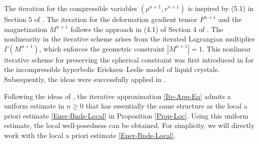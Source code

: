 \documentclass[reqno,11pt]{amsart}
\numberwithin{equation}{section}
\begin{document}
The iteration for the compressible variables $(\rho^{n+1}, v^{n+1})$ is inspired by (5.1) in Section 5 of \cite{JLT-M3AS-2020}. The iteration for the deformation gradient tensor $F^{n+1}$ and the magnetization $M^{n+1}$ follows the approach in (4.1) of Section 4 of \cite{JLL-JDE-2023}. The nonlinearity in the iterative scheme arises from the iterated Lagrangian multiplier $\Gamma(M^{n+1})$, which enforces the geometric constraint $|M^{n+1}|=1$. This nonlinear iterative scheme for preserving the spherical constraint was first introduced in \cite{JL-SIMA-2019} for the incompressible hyperbolic Ericksen–Leslie model of liquid crystals. Subsequently, the ideas were successfully applied in \cite{JLL-JDE-2023,JLT-M3AS-2020}.

Following the ideas of \cite{JLL-JDE-2023,JL-SIMA-2019,JLT-M3AS-2020}, the iterative approximation \eqref{Ite-App-Eq} admits a uniform estimate in $n\ge0$ that has essentially the same structure as the local a priori estimate \eqref{Ener-Bnds-Local} in Proposition \ref{Prop-Loc}. Using this uniform estimate, the local well-posedness can be obtained. For simplicity, we will directly work with the local a priori estimate \eqref{Ener-Bnds-Local}.
\end{document}
